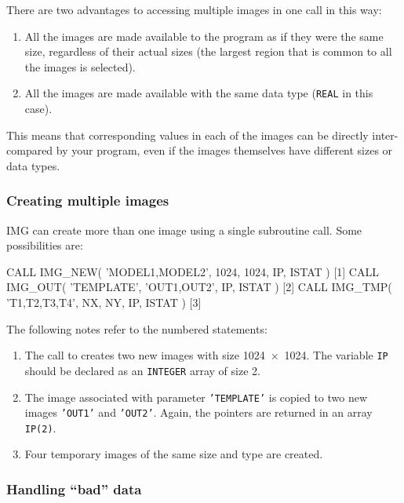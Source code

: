 \documentclass[twoside,11pt,nolof]{starlink}
\providecommand{\myverb}[1]{{\texttt{#1}}}
\providecommand{\mynote}{The following notes refer to the numbered statements:}
\newenvironment{code}{\begin{small}}
                     {\end{small}}
\newenvironment{enumnotes}
{
   \renewcommand{\labelenumi}{\myverb{[\theenumi]}}
   \begin{enumerate}
}{
   \end{enumerate}
   \renewcommand{\labelenumi}{\theenumi}
}
\begin{document}
There are two advantages to accessing multiple images in one call in
this way:
\begin{enumerate}
\item
All the images are made available to the program as if they were the
same size, regardless of their actual sizes (the largest region that
is common to all the images is selected).

\item
All the images are made available with the same data type
(\myverb{REAL} in this case).
\end{enumerate}
This means that corresponding values in each of the images can be
directly inter-compared by your program, even if the images themselves
have different sizes or data types.

\subsubsection{Creating multiple images}
IMG can  create more than one image using a single
subroutine call. Some possibilities are:
\begin{code}
\begin{terminalv}
      CALL IMG_NEW( 'MODEL1,MODEL2', 1024, 1024, IP, ISTAT )  [1]
      CALL IMG_OUT( 'TEMPLATE', 'OUT1,OUT2', IP, ISTAT )      [2]
      CALL IMG_TMP( 'T1,T2,T3,T4', NX, NY, IP, ISTAT )        [3]
\end{terminalv}
\end{code}
\mynote
\begin{enumnotes}
\item The call to \htmlref{\myverb{IMG\_NEW}}{IMG_NEW[n][x]} creates two new images with size
1024~$\times$~1024. The variable \myverb{IP} should be declared as
an \myverb{INTEGER} array of size 2.

\item The image associated with parameter \myverb{'TEMPLATE'} is
copied to two new images \myverb{'OUT1'} and \myverb{'OUT2'}.
Again, the pointers are returned in an array \myverb{IP(2)}.

\item Four temporary images of the same size and type are created.
\end{enumnotes}

\subsubsection{Handling \label{IMGBADDATA}``bad'' data}
\end{document}
